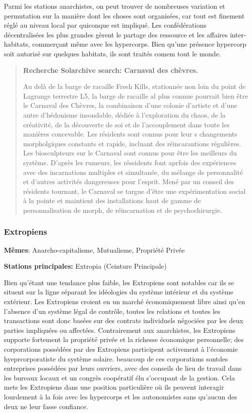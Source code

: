 Parmi les stations anarchistes, on peut trouver de nombreuses variation et permutation sur la manière dont les choses sont organisées, car tout est finement réglé au niveau local par quiconque est impliqué. Les confédérations décentralisées les plus grandes gèrent le partage des ressource et les affaires inter-habitats, commerçant même avec les hypercorps. Bien qu'une présence hypercorp soit autorisé sur quelques habitats, ils sont traités comem tout le monde. 

\begin{quotation} \textbf{Recherche Solarchive search: Carnaval des chèvres.} 

Au delà de la barge de racaille Fresh Kills, stationnée non loin du point de Lagrange terrestre L5, la barge de racaille al plus connue pourrait bien être le Carnaval des Chèvres, la combinaison d'une colonie d'artiste et d'une antre d'hédonisme insondable, dédiée à l'exploration du chaos, de la créativité, de la découverte de soi et de l'accouplement dans toute les manières concevable. Les résidents sont connus pour leur s changements morpholgiques constants et rapide, incluant des réincarantions régulières. Les biosculpteurs sur le Carnaval sont connus pour être les meilleurs du système. D'après les rumeurs, les réssidents font aprfois des expériences avec des incarnations multiples et simultanée, du mélange de personnalité et d'autres activités dangereuses pour l'esprit. Mené par un conseil des résidents tournant, le Carnaval se targue d'être une expérimentation social à la pointe et maintient des installations haut de gamme de personnalisation de morph, de réincarnation et de psychochirurgie. \end{quotation} 

\subsubsection{Extropiens} \label{sec:extropians} 

\textbf{Mêmes}: Anarcho-capitalisme, Mutualisme, Propriété Privée 

\textbf{Stations principales:} Extropia (Ceinture Principale) 

Bien qu'étant une tendance plus faible, les Extropiens sont notables car ils se situent sur la ligne séparant les idéologies du système intérieur et du système extérieur. Les Extropiens croient en un marché économiquement libre ainsi qu'en l'absence d'un système légal de contrôle, toutes les relations et toutes les transactions sont donc basées sur des contrats individuels négociées par les deux parties impliquées ou affectées. Contrairement aux anarchistes, les Extropiens supporte fortement la propriété privée et la richesse économique personnelle; des corporations possédées par des Extropiens participent activement à l'économie hyeprcorporatiste du système solaire. beaucoup de ces corporations sontdes entreprises possédées par leurs ouvriers, avec des conseils de lieu de travail dans les bureaux locaux et un congrès coopératif élu s'occupant de la gestion. Cela mets les Extropiens dans une position particulière où ils peuvent interagir lourdement à la fois avec les hypercorps et les autonomistes sans qu'aucun des deux ne leur fasse confiance. 

